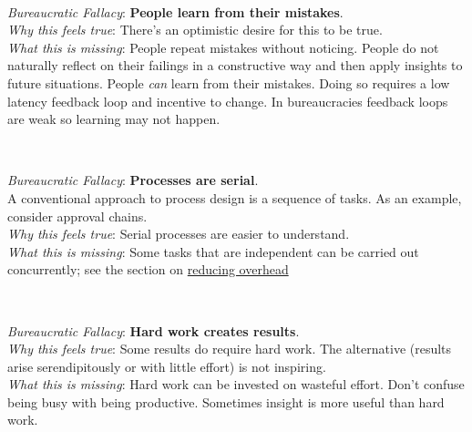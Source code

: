 \ \\
\begin{samepage}
\textit{Bureaucratic Fallacy}: \textbf{People learn from their mistakes}. \\
\textit{Why this feels true}: There's an optimistic desire for this to be true. \\
\textit{What this is missing}: 
People repeat mistakes without noticing. People do not naturally reflect on their failings in a constructive way and then apply insights to future situations.
People \textit{can} learn from their mistakes. Doing so requires a low latency feedback loop and incentive to change. In bureaucracies feedback loops are weak so learning may not happen.
\end{samepage}

\ \\
\begin{samepage}
\textit{Bureaucratic Fallacy}: \textbf{Processes are serial}.\\
A conventional approach to process design is a sequence of tasks. As an example, consider approval chains. \\
\textit{Why this feels true}: Serial processes are easier to understand. \\
\textit{What this is missing}: Some tasks that are independent can be carried out concurrently; see the section on \hyperref[sec:reducing-overhead]{reducing overhead}%
\iftoggle{haspagenumbers}{ on page~\pageref{sec:reducing-overhead}.}{.}
\end{samepage}

\ \\
\begin{samepage}
\textit{Bureaucratic Fallacy}: \textbf{Hard work creates results}.\\
\textit{Why this feels true}: Some results do require hard work. The alternative (results arise serendipitously or with little effort) is not inspiring. \\
\textit{What this is missing}: Hard work can be invested on wasteful effort. Don't confuse being busy with being productive. Sometimes insight is more useful than hard work. 
\end{samepage}





